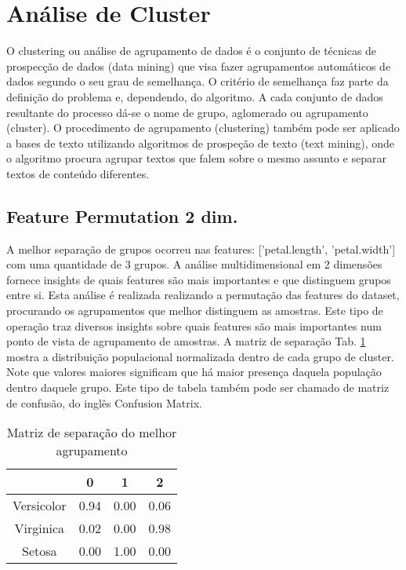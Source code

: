 \documentclass{article}%
\begin{document}
\section{Análise de Cluster}%
\label{sec:AnlisedeCluster}%
O clustering ou análise de agrupamento de dados é o conjunto de técnicas de prospecção de dados (data mining) que visa fazer agrupamentos automáticos de dados segundo o seu grau de semelhança. O critério de semelhança faz parte da definição do problema e, dependendo, do algoritmo. A cada conjunto de dados resultante do processo dá{-}se o nome de grupo, aglomerado ou agrupamento (cluster). O procedimento de agrupamento (clustering) também pode ser aplicado a bases de texto utilizando algoritmos de prospeção de texto (text mining), onde o algoritmo procura agrupar textos que falem sobre o mesmo assunto e separar textos de conteúdo diferentes. %
\newline%
\subsection{Feature Permutation 2 dim.}%
\label{subsec:FeaturePermutation2dim.}%
A melhor separação de grupos ocorreu nas features: {[}'petal.length', 'petal.width'{]} com uma quantidade de 3 grupos. A análise multidimensional em 2 dimensões fornece insights de quais features são mais importantes e que distinguem grupos entre si. Esta análise é realizada realizando a permutação das features do dataset, procurando os agrupamentos que melhor distinguem as amostras. Este tipo de operação traz diversos insights sobre quais features são mais importantes num ponto de vista de agrupamento de amostras.%
\newline%
A matriz de separação Tab. \ref{tab:matsep} mostra a distribuição populacional normalizada dentro de cada grupo de cluster. Note que valores maiores significam que há maior presença daquela população dentro daquele grupo. Este tipo de tabela também pode ser chamado de matriz de confusão, do inglês Confusion Matrix.%
\newline%


\begin{table}[htbp]%
\caption{Matriz de separação do melhor agrupamento}%
\centering%
\begin{tabular}{cccc}
\toprule
{} &    0 &    1 &    2 \\
\midrule
Versicolor & 0.94 & 0.00 & 0.06 \\
Virginica  & 0.02 & 0.00 & 0.98 \\
Setosa     & 0.00 & 1.00 & 0.00 \\
\bottomrule
\end{tabular}
%
\label{tab:matsep}%
\end{table}
\end{document}
